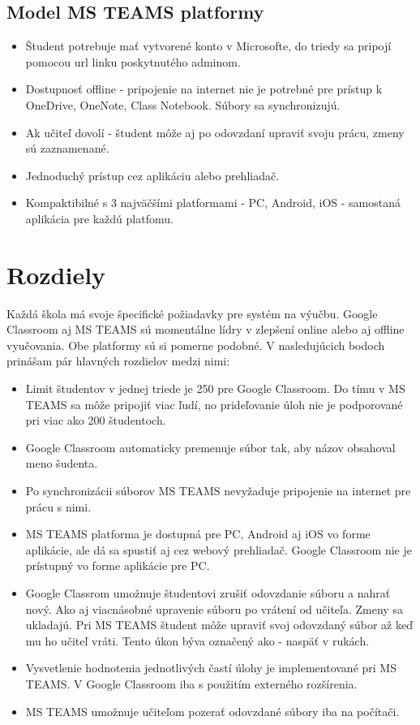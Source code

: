 \documentclass[10pt,slovak,a4paper]{article}
\begin{document}
\subsection{Model MS TEAMS platformy} \label{MS TEAMS: MS TEAMS platforma}

\begin{itemize}
	\item Študent potrebuje mať vytvorené konto v Microsofte, do triedy sa pripojí pomocou url linku poskytnutého adminom.
	\item Dostupnosť offline - pripojenie na internet nie je potrebné pre prístup k OneDrive, OneNote, Class Notebook. Súbory sa synchronizujú.
 	\item Ak učiteľ dovolí - študent môže aj po odovzdaní upraviť svoju prácu, zmeny sú zaznamenané.
	\item Jednoduchý prístup cez aplikáciu alebo prehliadač.
	\item Kompaktibilné s 3 najväčšími platformami - PC, Android, iOS - samostaná aplikácia pre každú platfomu. 
\cite {porovnanie}
	\end{itemize}


\section{Rozdiely } \label{Rozdiely}
Každá škola má svoje špecifické požiadavky pre systém na výučbu. Google Classroom aj MS TEAMS sú momentálne lídry v zlepšení online alebo aj offline vyučovania. Obe platformy sú si pomerne podobné. V nasledujúcich bodoch prinášam pár hlavných rozdielov medzi nimi:\cite{porovnanie}


\begin{itemize}
	\item Limit študentov v jednej triede je 250 pre Google Classroom.  Do tímu v MS TEAMS sa môže pripojiť viac ľudí, no prideľovanie úloh nie je podporované pri viac ako 200 študentoch.
	\item Google Classroom automaticky premenuje súbor tak, aby názov obsahoval meno šudenta.
	\item Po synchronizácii súborov MS TEAMS nevyžaduje pripojenie na internet pre prácu s nimi.	
	\item MS TEAMS platforma je dostupná pre PC, Android aj iOS vo forme aplikácie, ale dá sa spustiť aj cez webový prehliadač. Google Classroom nie je prístupný vo forme aplikácie pre PC.
	\item Google Classrom umožnuje študentovi zrušiť odovzdanie súboru a nahrať nový. Ako aj viacnásobné upravenie súboru po vrátení od učiteľa. Zmeny sa ukladajú. Pri MS TEAMS študent môže upraviť svoj odovzdaný súbor až keď mu ho učiteľ vráti. Tento úkon býva označený ako - naspäť v rukách.
	\item Vysvetlenie hodnotenia jednotlivých častí úlohy je implementované pri MS TEAMS. V Google Classroom iba s použitím externého rozšírenia.
	\item MS TEAMS umožnuje učiteľom pozerať odovzdané súbory iba na počítači.
\end{itemize}
\end{document}
